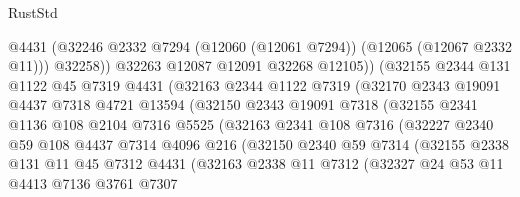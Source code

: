 \begin{lexlean}{RustStd}
\begin{coremodule}
                          @4431
                          (@32246 @2332 @7294 (@12060 (@12061 @7294)) (@12065 (@12067 @2332 @11)))
                          @32258))
                      @32263
                      @12087
                      @12091
                      @32268
                      @12105))
                  (@32155
                    @2344
                    @131
                    @1122
                    @45
                    @7319
                    @4431
                    (@32163
                      @2344
                      @1122
                      @7319
                      (@32170
                        @2343
                        @19091
                        @4437
                        @7318
                        @4721
                        @13594
                        (@32150
                          @2343
                          @19091
                          @7318
                          (@32155
                            @2341
                            @1136
                            @108
                            @2104
                            @7316
                            @5525
                            (@32163
                              @2341
                              @108
                              @7316
                              (@32227
                                @2340
                                @59
                                @108
                                @4437
                                @7314
                                @4096
                                @216
                                (@32150
                                  @2340
                                  @59
                                  @7314
                                  (@32155
                                    @2338
                                    @131
                                    @11
                                    @45
                                    @7312
                                    @4431
                                    (@32163
                                      @2338
                                      @11
                                      @7312
                                      (@32327
                                        @24
                                        @53
                                        @11
                                        @4413
                                        @7136
                                        @3761
                                        @7307

\end{coremodule}
\end{lexlean}
